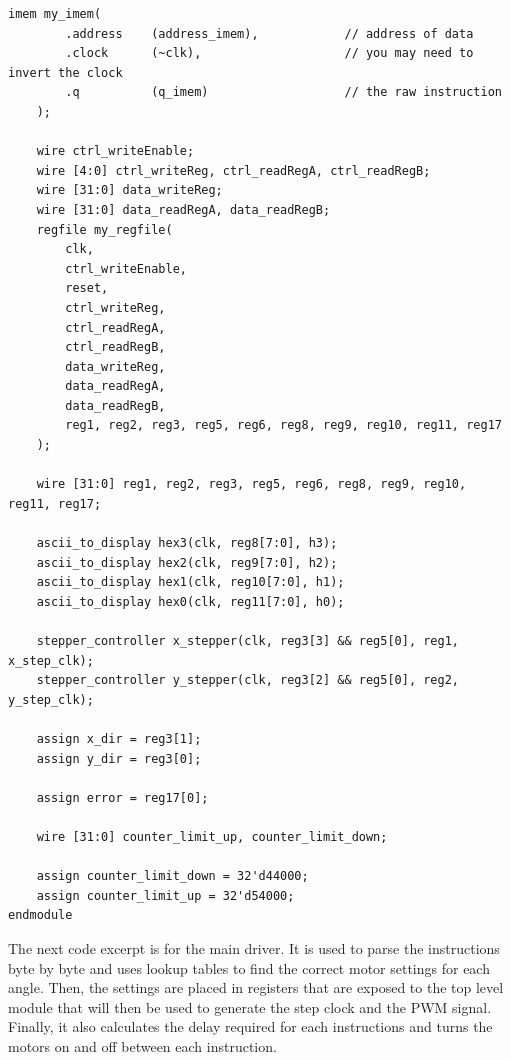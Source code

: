 \documentclass[12pt]{article}
\begin{document}
\begin{lstlisting}[style=myVerilog, caption={The Top Level Module}]
	imem my_imem(
	    .address    (address_imem),            // address of data
	    .clock      (~clk),                    // you may need to invert the clock
	    .q          (q_imem)                   // the raw instruction
	);
	 
	wire ctrl_writeEnable;
	wire [4:0] ctrl_writeReg, ctrl_readRegA, ctrl_readRegB;
	wire [31:0] data_writeReg;
	wire [31:0] data_readRegA, data_readRegB;
	regfile my_regfile(
	    clk,
	    ctrl_writeEnable,
	    reset,
	    ctrl_writeReg,
	    ctrl_readRegA,
	    ctrl_readRegB,
	    data_writeReg,
	    data_readRegA,
	    data_readRegB,
	    reg1, reg2, reg3, reg5, reg6, reg8, reg9, reg10, reg11, reg17
	);
	
	wire [31:0] reg1, reg2, reg3, reg5, reg6, reg8, reg9, reg10, reg11, reg17;
	
	ascii_to_display hex3(clk, reg8[7:0], h3);
	ascii_to_display hex2(clk, reg9[7:0], h2);
	ascii_to_display hex1(clk, reg10[7:0], h1);
	ascii_to_display hex0(clk, reg11[7:0], h0);
	
	stepper_controller x_stepper(clk, reg3[3] && reg5[0], reg1, x_step_clk);
	stepper_controller y_stepper(clk, reg3[2] && reg5[0], reg2, y_step_clk);
	
	assign x_dir = reg3[1];
	assign y_dir = reg3[0];
	
	assign error = reg17[0];
	
	wire [31:0] counter_limit_up, counter_limit_down;
	
	assign counter_limit_down = 32'd44000;
	assign counter_limit_up = 32'd54000;
endmodule
\end{lstlisting}

The next code excerpt is for the main driver. It is used to parse the instructions byte by byte and uses lookup tables to find the correct motor settings for each angle. Then, the settings are placed in registers that are exposed to the top level module that will then be used to generate the step clock and the PWM signal. Finally, it also calculates the delay required for each instructions and turns the motors on and off between each instruction.
\end{document}
